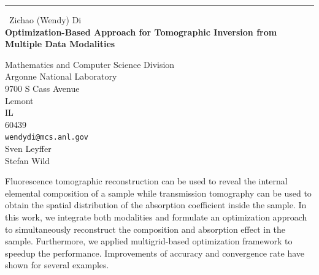 \documentclass{report}
\begin{document}
\begin{center}
\rule{6in}{1pt} \
{\large Zichao (Wendy) Di \\
{\bf Optimization-Based Approach for Tomographic Inversion from Multiple Data Modalities}}

Mathematics and Computer Science Division \\ Argonne National Laboratory \\ 9700 S Cass Avenue \\ Lemont \\ IL \\ 60439
\\
{\tt wendydi@mcs.anl.gov}\\
Sven Leyffer\\
Stefan Wild\end{center}

Fluorescence tomographic reconstruction can be used to reveal the internal
elemental composition of a sample while transmission tomography can be used
to obtain the spatial distribution of the absorption coefficient inside the sample.
In this work, we integrate both modalities and formulate an optimization
approach to simultaneously reconstruct the composition and absorption effect in
the sample. Furthermore, we applied multigrid-based optimization
framework to speedup the performance. Improvements of accuracy and
convergence rate have shown for several
examples.
\end{document}
